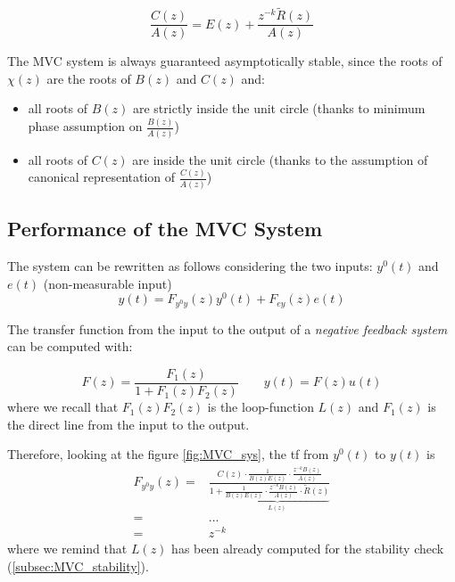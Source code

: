\[ \frac{C(z)}{A(z)} = E(z) + \frac{z^{-k} \tilde{R}(z)}{A(z)} \]

The MVC system is always guaranteed asymptotically stable, since the roots of $\chi(z)$ are the roots of $B(z)$ and $C(z)$ and:
\begin{itemize}
    \item all roots of $B(z)$ are strictly inside the unit circle (thanks to minimum phase assumption on $\frac{B(z)}{A(z)}$)
    \item all roots of $C(z)$ are inside the unit circle (thanks to the assumption of canonical representation of $\frac{C(z)}{A(z)}$)
\end{itemize}

\subsection{Performance of the MVC System}\label{subsec:MVC_performance}

The system can be rewritten as follows considering the two inputs: $y^0(t)$ and $e(t)$ (non-measurable input)
\[ 
	y(t) = F_{y^0y}(z) y^0(t) + F_{ey}(z) e(t)
\]

\begin{rem}
    The transfer function from the input to the output of a \emph{negative feedback system} can be computed with:
    \begin{figure}[H]
        \centering
    \end{figure}

    \[ 
    	F(z) = \frac{F_1(z)}{1 + F_1(z) F_2(z)} \qquad y(t) = F(z) u(t)
    \]
    where we recall that $F_1(z) F_2(z)$ is the loop-function $L(z)$
 	and $F_1(z)$ is the direct line from the input to the output.
\end{rem}

Therefore, looking at the figure \ref{fig:MVC_sys}, the \gls{tf} from $y^0(t)$ to $y(t)$ is
\begin{align*}
	F_{y^0y}(z) =& \frac{C(z) \cdot \frac{1}{B(z) E(z)} \cdot \frac{z^{-k} B(z)}{A(z)}}{1 + \underbrace{\frac{1}{B(z)E(z)}\cdot \frac{z^{-k}B(z)}{A(z)}\cdot\tilde{R}(z)}_{L(z)}} \\
	=& \dots \\
	=& z^{-k}
\end{align*}
where we remind that $L(z)$ has been already computed for the stability check (\ref{subsec:MVC_stability}). 

